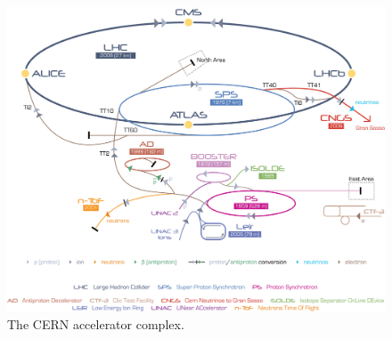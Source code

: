 \begin{figure}[t]
\centering
\includegraphics[width=1.0\textwidth]{Images/Cern-Accelerator-Complex}
\caption[The CERN accelerator complex.]{The CERN accelerator complex. \cite{LHC}}
\label{Fig:cap3-1.1}
\end{figure}

